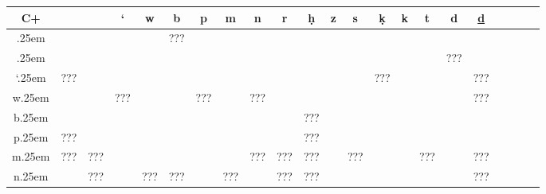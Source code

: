 \documentclass{standalone}
\newcommand{\aeg}[2][\normalsize]{{#1\pmglyph{#2}}}
\def\tran#1{\translitpmhgfont{#1}}
\begin{document}
\def\sp{\kern.25em}
	\begin{tabular}{|c||ccccccccccccccccccccc}\hline
		C+                        & \textyogh        & \tran{\Hic} & `   & w                 & b              & p         & m           & n                            & r         & \d{h} & z           & s              & \d{k} & k & t   & d   & \underline{d} \\ \hline\hline
		\textyogh\sp\aeg{\Ha}     &                  &             &     & \aeg{\HZ}         & ???            &           &             &                              &           &       &             &                &       &   &     &     &               \\\hline
		\tran{\Hic}\sp\aeg{\Hi}   &                  &             &     & \aeg{\HL}         & \aeg{\HFxxxiv} &           & \aeg{\HM}   & \aeg{\HF}                    & \aeg{\He} &       & \aeg{\HYiV} &                &       &   &     & ??? &               \\\hline
		`\sp\aeg{\HA}             & ???              &             &     &                   &                &           &             &                              &           &       &             &                & ???   &   &     &     & ???           \\\hline
		w\sp\aeg{\Hw}             & \aeg{\Ho}        &             & ??? &                   &                & ???       &             & ???                          & \aeg{\HR} &       &             &                &       &   &     &     & ???           \\\hline
		b\sp\aeg{\Hb}             & \aeg{\Hibw}      &             &     &                   &                &           &             &                              &           & ???   &             &                &       &   &     &     &               \\\hline
		p\sp\aeg{\Hp}             & ???              &             &     &                   &                &           &             &                              & \aeg{\Hj} & ???   &             &                &       &   &     &     &               \\\hline
		m\sp\aeg{\Hm}             & ???              & ???         &     & \aeg{\Hn:\Hn:\Hn} &                &           &             & ???                          & ???       & ???   &             & ???            &       &   & ??? &     & ???           \\\hline
		n\sp\aeg{\Hn}             &                  & ???         &     & ???               & ???            &           & ???         & \aeg{\HSxxxix}\aeg{\HSxxxix} & ???       & ???   &             & \aeg{\Htongue} &       &   &     &     & ???           \\\hline

\end{tabular}
\end{document}
